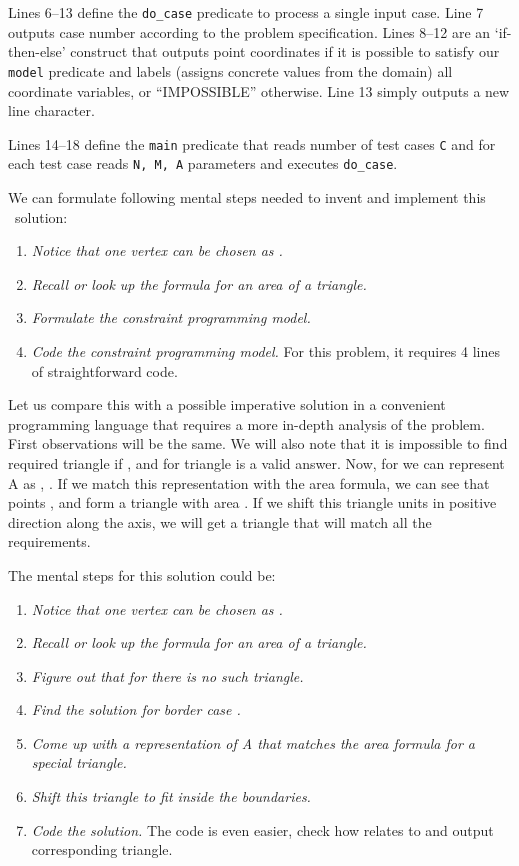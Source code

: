 \documentclass{acm_proc_article-sp}
\begin{document}
Lines 6--13 define the \texttt{do\_case} predicate to process a single input case. Line 7 outputs case number according to the problem specification.
Lines 8--12 are an `if-then-else' construct that outputs point coordinates if it is possible to satisfy our \texttt{model} predicate and labels (assigns concrete values from the domain)
all coordinate variables, or ``IMPOSSIBLE'' otherwise.
Line 13 simply outputs a new line character.

Lines 14--18 define the \texttt{main} predicate that reads number of test cases \texttt{C} and for each test case reads \texttt{N, M, A} parameters and executes \texttt{do\_case}.

We can formulate following mental steps needed to invent and implement this \eclipse\ solution:

\begin{enumerate}
\item \textit{Notice that one vertex can be chosen as .}
\item \textit{Recall or look up the formula for an area of a triangle.}
\item \textit{Formulate the constraint programming model.}
\item \textit{Code the constraint programming model.} 
For this problem, it requires 4 lines of straightforward code.
\end{enumerate}

Let us compare this with a possible imperative
solution in a convenient programming language that requires a more in-depth analysis of the problem.
First observations will be the same. We will also note that it is impossible to find required triangle
if , and for  triangle  is a valid answer.
Now, for  we can represent A as , . 
If we match this representation with the area formula, we can see that points , and 
form a triangle with area . If we shift this triangle  units in positive direction along the  axis, we will get 
a triangle  that will match all the requirements.

The mental steps for this solution could be:

\begin{enumerate}
\item \textit{Notice that one vertex can be chosen as .}
\item \textit{Recall or look up the formula for an area of a triangle.}
\item \textit{Figure out that for  there is no such triangle.}
\item \textit{Find the solution for border case .}
\item \textit{Come up with a representation of A that matches the area formula for a special triangle.}
\item \textit{Shift this triangle to fit inside the boundaries.}
\item \textit{Code the solution.} The code is even easier, check how  relates to  and output corresponding triangle.
\end{enumerate}
\end{document}
